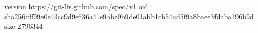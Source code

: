 version https://git-lfs.github.com/spec/v1
oid sha256:df99e0e43cc9d9e636a41e9abe9b9de01abb1cb54ad5f9a8baee3fdaba196b9d
size 2796344
